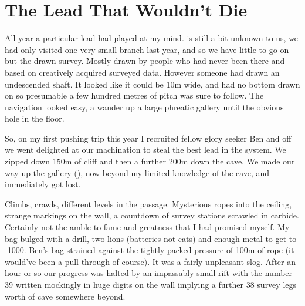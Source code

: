 \section{The Lead That Wouldn't Die}
\begin{marginfigure}
\end{marginfigure}

All year a particular lead had played at my mind.  is still a bit unknown to us, we had only visited one very small branch last year, and so we have little to go on but the drawn survey. Mostly drawn by people who had never been there and based on creatively acquired surveyed data. However someone had drawn an undescended shaft. It looked like it could be 10m wide, and had no bottom drawn on so presumable a few hundred metres of pitch was sure to follow. The navigation looked easy, a wander up a large phreatic gallery until the obvious hole in the floor.

So, on my first pushing trip this year I recruited fellow glory seeker Ben and off we went delighted at our machination to steal the best lead in the system. We zipped down 150m of cliff and then a further 200m down the cave. We made our way up the gallery (), now beyond my limited knowledge of the cave, and immediately got lost.
 
Climbs, crawls, different levels in the passage. Mysterious ropes into the ceiling, strange markings on the wall, a countdown of survey stations scrawled in carbide. Certainly not the amble to fame and greatness that I had promised myself. My bag bulged with a drill, two lions (batteries not cats) and enough metal to get to -1000. Ben’s bag strained against the tightly packed pressure of 100m of rope (it would’ve been a pull through of course). It was a fairly unpleasant slog. After an hour or so our progress was halted by an impassably small rift with the number 39 written mockingly in huge digits on the wall implying a further 38 survey legs worth of cave somewhere beyond.
 
